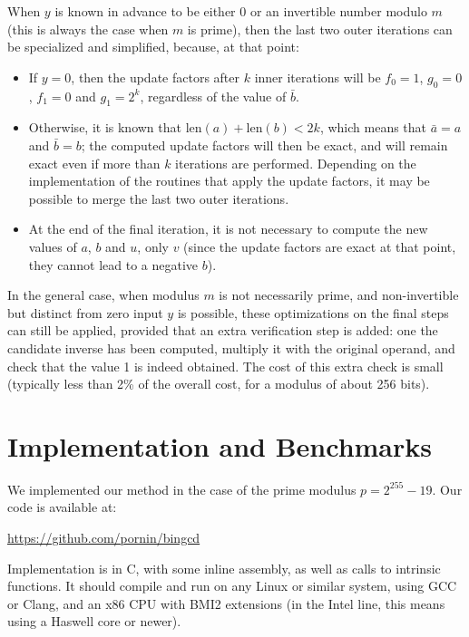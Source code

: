 \documentclass{llncs}
\newcommand{\bitlength}{\text{len}}
\begin{document}
When $y$ is known in advance to be either 0 or an invertible number
modulo $m$ (this is always the case when $m$ is prime), then the last
two outer iterations can be specialized and simplified, because, at
that point:
\begin{itemize}

    \item If $y = 0$, then the update factors after $k$ inner
    iterations will be $f_0 = 1$, $g_0 = 0$, $f_1 = 0$ and $g_1 = 2^k$,
    regardless of the value of $\bar b$.

    \item Otherwise, it is known that $\bitlength(a) + \bitlength(b) <
    2k$, which means that $\bar a = a$ and $\bar b = b$; the computed
    update factors will then be exact, and will remain exact even if
    more than $k$ iterations are performed. Depending on the
    implementation of the routines that apply the update factors, it may
    be possible to merge the last two outer iterations.

    \item At the end of the final iteration, it is not necessary to
    compute the new values of $a$, $b$ and $u$, only $v$ (since the
    update factors are exact at that point, they cannot lead to a
    negative $b$).

\end{itemize}

In the general case, when modulus $m$ is not necessarily prime, and
non-invertible but distinct from zero input $y$ is possible, these
optimizations on the final steps can still be applied, provided that an
extra verification step is added: one the candidate inverse has been
computed, multiply it with the original operand, and check that the
value 1 is indeed obtained. The cost of this extra check is small
(typically less than 2\% of the overall cost, for a modulus of about 256
bits).

\section{Implementation and Benchmarks}

We implemented our method in the case of the prime modulus
$p = 2^{255}-19$. Our code is available at:
\begin{center}
    \url{https://github.com/pornin/bingcd}
\end{center}
Implementation is in C, with some inline assembly, as well as calls to
intrinsic functions. It should compile and run on any Linux or similar
system, using GCC or Clang, and an x86 CPU with BMI2 extensions (in the
Intel line, this means using a Haswell core or newer).
\end{document}
